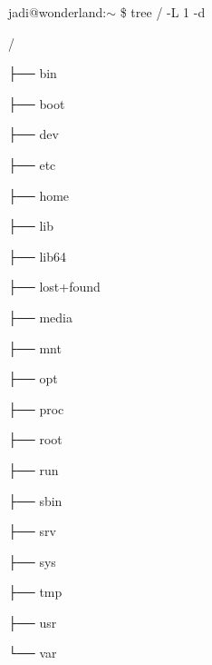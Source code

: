 \begin{frameng}
jadi@wonderland:$\sim$ \$ tree / -L 1 -d

/

├── bin

\vspace{-0.1cm}

├── boot

\vspace{-0.1cm}

├── dev

\vspace{-0.1cm}

├── etc

\vspace{-0.1cm}

├── home

\vspace{-0.1cm}

├── lib

\vspace{-0.1cm}

├── lib64

\vspace{-0.1cm}

├── lost+found

\vspace{-0.1cm}

├── media

\vspace{-0.1cm}

├── mnt

\vspace{-0.1cm}

├── opt

\vspace{-0.1cm}

├── proc

\vspace{-0.1cm}

├── root

\vspace{-0.1cm}

├── run

\vspace{-0.1cm}

├── sbin

\vspace{-0.1cm}

├── srv

\vspace{-0.1cm}

├── sys

\vspace{-0.1cm}

├── tmp

\vspace{-0.1cm}

├── usr

\vspace{-0.1cm}

└── var
\end{frameng}
